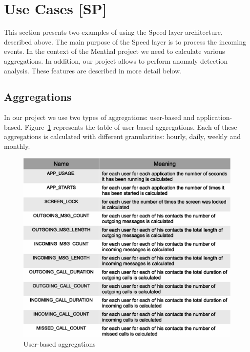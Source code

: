 \section{Use Cases [SP]}
\label{sec:use_cases}



This section presents two examples of using the Speed layer architecture, described above.
The main purpose of the Speed layer is to process the incoming events.
In the context of the Menthal project we need to calculate various aggregations.
In addition, our project allows to perform anomaly detection analysis.
These features are described in more detail below.

\subsection{Aggregations}

In our project we use two types of aggregations: user-based and application-based.
Figure~\ref{fig:user_based_aggregations} represents the table of user-based aggregations.
Each of these aggregations is calculated with different granularities: hourly, daily, weekly and monthly.

\begin{figure}
  \centering
  \includegraphics [width=1.0\textwidth]{images/user_based_aggregations}
  \caption{User-based aggregations}
  \label{fig:user_based_aggregations}
\end{figure}

